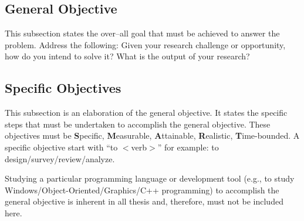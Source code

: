 \subsection{General Objective}
\label{sec:generalobjective}

This subsection states the over--all goal that must be achieved to answer the problem.
Address the following: Given your research challenge or opportunity, how do you intend  to solve it? What is the output of your research?


\subsection{Specific Objectives}
\label{sec:specificobjectives}

%
%

This subsection is an elaboration of the general objective.  
It states the specific steps that must be undertaken to accomplish the general objective.  
These objectives must be \textbf{S}pecific, \textbf{M}easurable, \textbf{A}ttainable, \textbf{R}ealistic, \textbf{T}ime-bounded.  
A specific objective start with ``to $<$verb$>$'' for example: to design/survey/review/analyze.

Studying a particular programming language or development tool (e.g., to study Windows/Object-Oriented/Graphics/C++ programming) to  accomplish the general objective is inherent in all thesis and, therefore, must not be included here.



